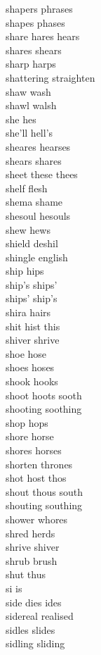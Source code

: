 shapers phrases\\
shapes phases\\
share hares hears\\
shares shears\\
sharp harps\\
shattering straighten\\
shaw wash\\
shawl walsh\\
she hes\\
she'll hell's\\
sheares hearses\\
shears shares\\
sheet these thees\\
shelf flesh\\
shema shame\\
shesoul hesouls\\
shew hews\\
shield deshil\\
shingle english\\
ship hips\\
ship's ships'\\
ships' ship's\\
shira hairs\\
shit hist this\\
shiver shrive\\
shoe hose\\
shoes hoses\\
shook hooks\\
shoot hoots sooth\\
shooting soothing\\
shop hops\\
shore horse\\
shores horses\\
shorten thrones\\
shot host thos\\
shout thous south\\
shouting southing\\
shower whores\\
shred herds\\
shrive shiver\\
shrub brush\\
shut thus\\
si is\\
side dies ides\\
sidereal realised\\
sidles slides\\
sidling sliding\\
